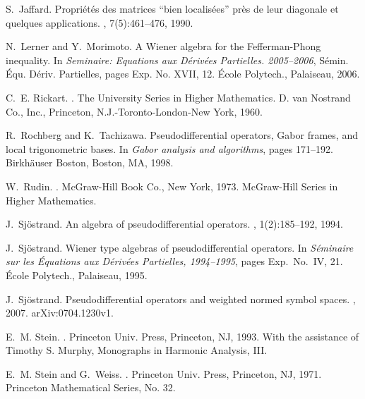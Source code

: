 \documentclass[12pt]{amsart}
\theoremstyle{definition}
\theoremstyle{remark}
\numberwithin{equation}{section}
\begin{document}
\begin{thebibliography}{10}
S.~Jaffard.
\newblock Propri\'et\'es des matrices ``bien localis\'ees'' pr\`es de leur
  diagonale et quelques applications.
, 7(5):461--476,
  1990.

N.~Lerner and Y.~Morimoto.
\newblock A {W}iener algebra for the {F}efferman-{P}hong inequality.
\newblock In {\em Seminaire: Equations aux D\'eriv\'ees Partielles.
  2005--2006}, S\'emin. \'Equ. D\'eriv. Partielles, pages Exp. No. XVII, 12.
  \'Ecole Polytech., Palaiseau, 2006.

C.~E. Rickart.
.
\newblock The University Series in Higher Mathematics. D. van Nostrand Co.,
  Inc., Princeton, N.J.-Toronto-London-New York, 1960.

R.~Rochberg and K.~Tachizawa.
\newblock Pseudodifferential operators, {G}abor frames, and local trigonometric
  bases.
\newblock In {\em Gabor analysis and algorithms}, pages 171--192. Birkh\"auser
  Boston, Boston, MA, 1998.

W.~Rudin.
.
\newblock McGraw-Hill Book Co., New York, 1973.
\newblock McGraw-Hill Series in Higher Mathematics.

J.~Sj{\"o}strand.
\newblock An algebra of pseudodifferential operators.
, 1(2):185--192, 1994.

J.~Sj{\"o}strand.
\newblock Wiener type algebras of pseudodifferential operators.
\newblock In {\em S\'eminaire sur les \'Equations aux D\'eriv\'ees Partielles,
  1994--1995}, pages Exp.\ No.\ IV, 21. \'Ecole Polytech., Palaiseau, 1995.

J.~Sj{\"o}strand.
\newblock Pseudodifferential operators and weighted normed symbol spaces.
, 2007.
\newblock arXiv:0704.1230v1.

E.~M. Stein.
.
\newblock Princeton Univ. Press, Princeton, NJ, 1993.
\newblock With the assistance of Timothy S. Murphy, Monographs in Harmonic
  Analysis, III.

E.~M. Stein and G.~Weiss.
.
\newblock Princeton Univ. Press, Princeton, NJ, 1971.
\newblock Princeton Mathematical Series, No. 32.


\end{thebibliography}
\end{document}
